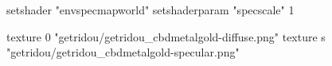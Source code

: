 setshader "envspecmapworld"
setshaderparam "specscale" 1

texture 0 "getridou/getridou_cbdmetalgold-diffuse.png"
texture s "getridou/getridou_cbdmetalgold-specular.png"

